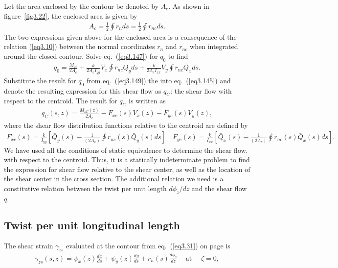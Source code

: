 \documentclass{AeroStructure-ERJohnson}
\begin{document}
\noindent Let the area enclosed by the contour be denoted by $A_{c}$. As shown in figure~\ref{fig3.22}, the enclosed area is given by
\begin{align}\label{eq3.148}
A_{c}=\frac{1}{2} \oint r_{n} d s=\frac{1}{2} \oint r_{n c} d s.
\end{align}
The two expressions given above for the enclosed area is a consequence of the relation (\ref{eq3.10}) between the normal coordinates $r_{n}$ and $r_{n c}$ when integrated around the closed contour. Solve eq.~(\ref{eq3.147}) for $q_0$ to find
\begin{align}\label{eq3.149}
q_{0}=\frac{M_{z c}}{2 A_{c}}+\frac{k}{2 A_{c} I_{y y}} V_{x} \oint r_{n c} \bar{Q}_{y} d s+\frac{k}{2 A_{c} I_{x x}} V_{y} \oint r_{n c} \bar{Q}_{x}ds.
\end{align}
Substitute the result for $q_0$ from eq.~(\ref{eq3.149}) the into eq.~(\ref{eq3.145}) and denote the resulting expression for this shear flow as $q_C$: the shear flow with respect to the centroid. The result for $q_C$ is written as
\begin{align}\label{eq3.150}
q_{C}(s, z)=\frac{M_{z C}(z)}{2 A_{c}}-F_{x c}(s) V_{x}(z)-F_{y c}(s) V_{y}(z),
\end{align}
where the shear flow distribution functions relative to the centroid are defined by
\begin{align}\label{eq3.151}
F_{x c}(s)=\frac{k}{I_{y y}}\left[\bar{Q}_{y}(s)-\frac{1}{\left(2 A_{c}\right)} \oint r_{n c}(s) \bar{Q}_{y}(s) d s\right] \quad F_{y c}(s)=\frac{k}{I_{x x}}\left[\bar{Q}_{x}(s)-\frac{1}{\left(2 A_{c}\right)} \oint r_{n c}(s) \bar{Q}_{x}(s) d s\right].
\end{align}
We have used all the conditions of static equivalence to determine the shear flow. with respect to the centroid. Thus, it is a statically indeterminate problem to find the expression for shear flow relative to the shear center, as well as the location of the shear center in the cross section. The additional relation we need is a constitutive relation between the twist per unit length $d \phi_{z} / d z$ and the shear flow $q$.

\subsection{Twist per unit longitudinal length}\label{sec3.11.1}

The shear strain $\gamma_{z s}$ evaluated at the contour from eq.~(\ref{eq3.31}) on page \pageref{eq3.31} is
\begin{align}\label{eq3.152}
\gamma_{z s}(s, z)=\psi_{x}(z) \frac{d x}{d s}+\psi_{y}(z) \frac{d y}{d s}+r_{n}(s) \frac{d \phi_{z}}{d z} \quad~\text{at } \quad \zeta=0,
\end{align}
\end{document}
